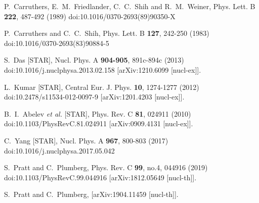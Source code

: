 \begin{thebibliography}{99}
P.~Carruthers, E.~M.~Friedlander, C.~C.~Shih and R.~M.~Weiner,
Phys. Lett. B \textbf{222}, 487-492 (1989)
doi:10.1016/0370-2693(89)90350-X

P.~Carruthers and C.~C.~Shih,
Phys. Lett. B \textbf{127}, 242-250 (1983)
doi:10.1016/0370-2693(83)90884-5

S.~Das [STAR],
Nucl. Phys. A \textbf{904-905}, 891c-894c (2013)
doi:10.1016/j.nuclphysa.2013.02.158
[arXiv:1210.6099 [nucl-ex]].

L.~Kumar [STAR],
Central Eur. J. Phys. \textbf{10}, 1274-1277 (2012)
doi:10.2478/s11534-012-0097-9
[arXiv:1201.4203 [nucl-ex]].

B.~I.~Abelev \textit{et al.} [STAR],
Phys. Rev. C \textbf{81}, 024911 (2010)
doi:10.1103/PhysRevC.81.024911
[arXiv:0909.4131 [nucl-ex]].

C.~Yang [STAR],
Nucl. Phys. A \textbf{967}, 800-803 (2017)
doi:10.1016/j.nuclphysa.2017.05.042

S.~Pratt and C.~Plumberg,
Phys. Rev. C \textbf{99}, no.4, 044916 (2019)
doi:10.1103/PhysRevC.99.044916
[arXiv:1812.05649 [nucl-th]].

S.~Pratt and C.~Plumberg,
[arXiv:1904.11459 [nucl-th]].


\end{thebibliography}
